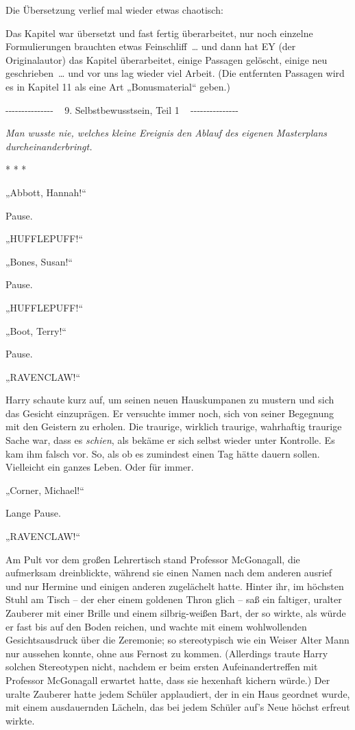 

\hypertarget{selbstbewusstsein-teil-1}{%

Die Übersetzung verlief mal wieder etwas chaotisch:

Das Kapitel war übersetzt und fast fertig überarbeitet, nur noch einzelne Formulierungen brauchten etwas Feinschliff~… und dann hat EY (der Originalautor) das Kapitel überarbeitet, einige Passagen gelöscht, einige neu geschrieben~… und vor uns lag wieder viel Arbeit. (Die entfernten Passagen wird es in Kapitel 11 als eine Art „Bonusmaterial“ geben.)

-\/-\/-\/-\/-\/-\/-\/-\/-\/-\/-\/-\/-\/-\/- ~ 9. Selbstbewusstsein, Teil 1 ~ -\/-\/-\/-\/-\/-\/-\/-\/-\/-\/-\/-\/-\/-\/-

\emph{Man wusste nie, welches kleine Ereignis den Ablauf des eigenen Masterplans durcheinanderbringt.}

* * *

„Abbott, Hannah!“

Pause.

„HUFFLEPUFF!“

„Bones, Susan!“

Pause.

„HUFFLEPUFF!“

„Boot, Terry!“

Pause.

„RAVENCLAW!“

Harry schaute kurz auf, um seinen neuen Hauskumpanen zu mustern und sich das Gesicht einzuprägen. Er versuchte immer noch, sich von seiner Begegnung mit den Geistern zu erholen. Die traurige, wirklich traurige, wahrhaftig traurige Sache war, dass es \emph{schien}, als bekäme er sich selbst wieder unter Kontrolle. Es kam ihm falsch vor. So, als ob es zumindest einen Tag hätte dauern sollen. Vielleicht ein ganzes Leben. Oder für immer.

„Corner, Michael!“

Lange Pause.

„RAVENCLAW!“

Am Pult vor dem großen Lehrertisch stand Professor McGonagall, die aufmerksam dreinblickte, während sie einen Namen nach dem anderen ausrief und nur Hermine und einigen anderen zugelächelt hatte. Hinter ihr, im höchsten Stuhl am Tisch -- der eher einem goldenen Thron glich -- saß ein faltiger, uralter Zauberer mit einer Brille und einem silbrig-weißen Bart, der so wirkte, als würde er fast bis auf den Boden reichen, und wachte mit einem wohlwollenden Gesichtsausdruck über die Zeremonie; so stereotypisch wie ein Weiser Alter Mann nur aussehen konnte, ohne aus Fernost zu kommen. (Allerdings traute Harry solchen Stereotypen nicht, nachdem er beim ersten Aufeinandertreffen mit Professor McGonagall erwartet hatte, dass sie hexenhaft kichern würde.) Der uralte Zauberer hatte jedem Schüler applaudiert, der in ein Haus geordnet wurde, mit einem ausdauernden Lächeln, das bei jedem Schüler auf's Neue höchst erfreut wirkte.

}

